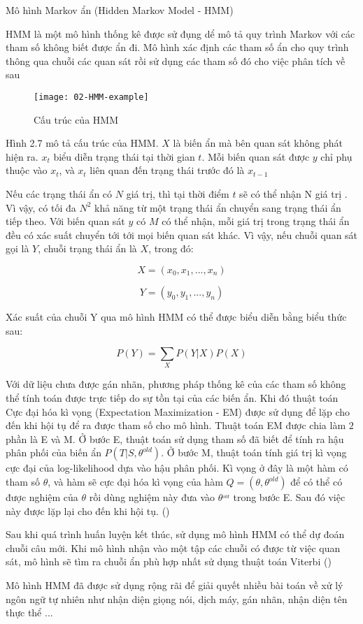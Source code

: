 \documentclass[../main.tex]{subfiles}
\begin{document}
Mô hình Markov ẩn (Hidden Markov Model - HMM) 

HMM là một mô hình thống kê được sử đụng dể mô tả quy trình Markov với các tham số không biết được ẩn đi. Mô hình xác định các tham số ẩn cho quy trình thông qua chuỗi các quan sát rồi sử dụng các tham số đó cho việc phân tích về sau \cite{rabiner1989tutorial}

\begin{figure}[h]
\centering
\texttt{[image: 02-HMM-example]}
\caption{Cấu trúc của HMM}
\end{figure}

Hình 2.7 mô tả cấu trúc của HMM. $X$ là biến ẩn mà bên quan sát không phát hiện ra. $x_{t}$ biểu diễn trạng thái tại thời gian $t$. Mỗi biến quan sát được $y$ chỉ phụ thuộc vào $x_{t}$, và $x_{t}$ liên quan đến trạng thái trước đó là $x_{t-1}$

Nếu các trạng thái ẩn có $N$ giá trị, thì tại thời điểm $t$ sẽ có thể nhận N giá trị . Vì vậy, có tối đa $N^{2}$ khả năng từ một trạng thái ẩn chuyển sang trạng thái ẩn tiếp theo. Với biến quan sát $y$ có $M$ có thể nhận, mỗi giá trị trong trạng thái ẩn đều có xác suất chuyển tới tới mọi biến quan sát khác. Vì vậy, nếu chuỗi quan sát gọi là $Y$, chuỗi trạng thái ẩn là $X$, trong đó:


\begin{equation}
X = (x_{0}, x_{1}, ..., x_{n}) \nonumber
\end{equation}

\begin{equation}
Y = (y_{0}, y_{1}, ..., y_{n}) \nonumber
\end{equation}

Xác suất của chuỗi Y qua mô hình HMM có thể được biểu diễn bằng biểu thức sau: 

\begin{equation}
P(Y) = \sum_{X} P(Y|X)P(X) \nonumber
\end{equation}


Với dữ liệu chưa được gán nhãn, phương pháp thống kê của các tham số không thể tính toán được trực tiếp do sự tồn tại của các biến ẩn. Khi đó thuật toán Cực đại hóa kì vọng (Expectation Maximization - EM) được sử dụng để lặp cho đến khi hội tụ để ra được tham số cho mô hình. Thuật toán EM được chia làm $2$ phần là E và M. Ở bước E, thuật toán sử dụng tham số đã biết để tính ra hậu phân phối của biến ẩn $P(T|S, \theta^{old})$. Ở bước M, thuật toán tính giá trị kì vọng cực đại của log-likelihood dựa vào hậu phân phối. Kì vọng ở đây là một hàm có tham số $\theta$, và hàm sẽ cực đại hóa kì vọng của hàm $Q = ( \theta, \theta^{old})$ để có thể có được nghiệm của $\theta$ rồi dùng nghiệm này đưa vào $\theta^_{old}$ trong bước E. Sau đó việc này được lặp lại cho đến khi hội tụ. (\citep{zhang2001segmentation})

Sau khi quá trình huấn luyện kết thúc, sử dụng mô hình HMM có thể dự đoán chuỗi câu mới. Khi mô hình nhận vào một tập các chuỗi có được từ việc quan sát, mô hình sẽ tìm ra chuỗi ẩn phù hợp nhất sử dụng thuật toán Viterbi (\cite{ghahramani2001introduction})

Mô hình HMM đã được sử dụng rộng rãi để giải quyết nhiều bài toán về xử lý ngôn ngữ tự nhiên như nhận diện giọng nói, dịch máy, gán nhãn, nhận diện tên thực thể ... \cite{ponomareva2007biomedical}
\end{document}
